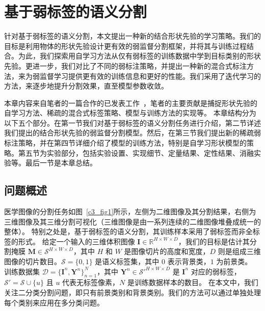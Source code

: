 \chapter{基于弱标签的语义分割}

针对基于弱标签的语义分割，本文提出一种新的结合形状先验的学习策略。我们的目标是利用物体的形状先验设计更有效的弱监督分割框架，并将其与训练过程结合。为此，我们探索用自学习方法从仅有弱标签的训练数据中学到目标类别的形状先验。更进一步，我们对比了不同的弱标注策略，并提出一种新的混合式标注方法，来为弱监督学习提供更有效的训练信息和更好的性能。我们采用了迭代学习的方法，来逐步地提升分割效果，直至模型参数收敛。

本章内容来自笔者的一篇合作的已发表工作~\citep{he2021weakly}，笔者的主要贡献是捕捉形状先验的自学习方法、稀疏的混合式标签策略、模型与训练方法的实现等。
本章结构分为以下五个部分。在第一节我们对基于弱标签的语义分割任务进行介绍，第二节详述我们提出的结合形状先验的弱监督分割模型。然后，在第三节我们提出新的稀疏弱标注策略，并在第四节详细介绍了模型的训练方法，特别是自学习形状模型的策略。第五节为实验部分，包括实验设置、实现细节、定量结果、定性结果、消融实验等。最后一节是本章总结。

\section{问题概述}
医学图像的分割任务如图~\ref{c3_fig1}所示，左侧为二维图像及其分割结果，右侧为三维图像及其三维分割可视化（三维图像是由一系列连续的二维图像堆叠成统一的整体）。
特别之处是，基于弱标签的语义分割，其训练样本采用了弱标签而非全标签的形式。
给定一个输入的三维体积图像 $\mathbf{I} \in \mathbb{R}^{H \times W \times D}$，我们的目标是估计其分割掩膜 $\mathbf{M} \in \mathcal{S}^{H \times W \times D}$，其中 $H$ 和 $W$ 是图像切片的高度和宽度，$D$ 则是组成三维图像的切片数目。$\mathcal{S} = \{0, 1\}$ 是语义标签集，其中 $0$ 表示背景类，$1$ 为前景类。
训练数据集 $\mathcal{D} = \{\mathbf{I}^n, \mathbf{Y}^n\}_{n=1}^N$，其中 $\mathbf{Y}^n \in \mathcal{S}'^{H \times W \times D}$ 是 $\mathbf{I}^n$ 对应的弱标签， $\mathcal{S}' = \mathcal{S} \cup \{u\}$ 且 $u$ 代表无标签像素，$N$ 是训练数据样本的数目。
在本文中，我们关注二分类分割问题，即只有前景类别和背景类别。我们的方法可以通过单独处理每个类别来应用在多分类问题。

